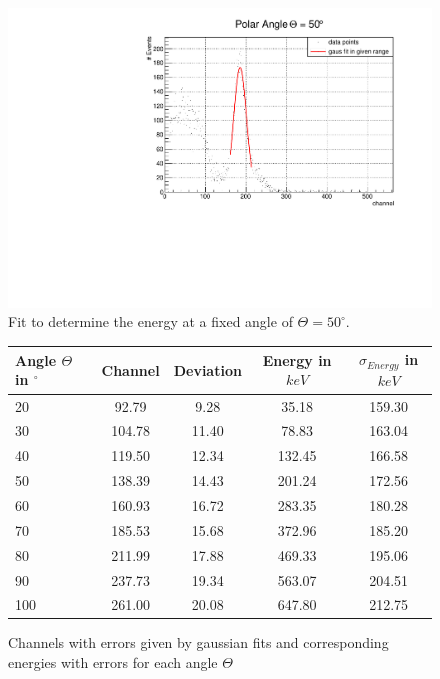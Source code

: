 \vspace*{1.5cm}

\begin{figure}[h]
\centering
\includegraphics[scale=0.5]{./../plots/50_deg.pdf}
\caption{Fit to determine the energy at a fixed angle of $\Theta = 50^{\circ}$.}
\end{figure}

\newpage


\begin{figure}[h]
\centering
\caption{Channels with errors given by gaussian fits and corresponding energies with errors for each angle $\Theta$}
\vspace{0.2cm}
\begin{tabular}{lcccc}
Angle $\Theta$ in ${}^{\circ}$ & Channel & Deviation & Energy in $keV$ & $\sigma _ {Energy}$ in $keV$ \\
\hline
\hline
20 & 92.79     &  9.28 & 35.18 & 159.30 \\
30 &104.78     &  11.40 & 78.83 & 163.04 \\
40 &119.50     &  12.34 & 132.45 & 166.58 \\
50 &138.39     &  14.43 & 201.24 & 172.56 \\
60 &160.93     &  16.72 & 283.35 & 180.28 \\
70 &185.53     &  15.68 & 372.96 & 185.20 \\
80 &211.99     &  17.88 & 469.33 & 195.06 \\
90 &237.73     &  19.34 & 563.07 & 204.51 \\
100 &261.00    &  20.08 & 647.80 & 212.75 \\
\end{tabular}
\end{figure}


